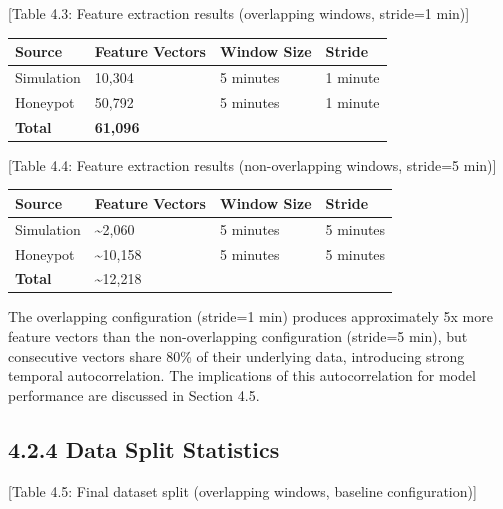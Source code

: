 \documentclass[
  a4paper]{report}
\newcounter{none} %
\begin{document}
{[}Table 4.3: Feature extraction results (overlapping windows, stride=1
min){]}

{\def\LTcaptype{none} %
\begin{longtable}[]{@{}llll@{}}
\toprule\noalign{}
Source & Feature Vectors & Window Size & Stride \\
\midrule\noalign{}
\endhead
\bottomrule\noalign{}
\endlastfoot
Simulation & 10,304 & 5 minutes & 1 minute \\
Honeypot & 50,792 & 5 minutes & 1 minute \\
\textbf{Total} & \textbf{61,096} & & \\
\end{longtable}
}

{[}Table 4.4: Feature extraction results (non-overlapping windows,
stride=5 min){]}

{\def\LTcaptype{none} %
\begin{longtable}[]{@{}llll@{}}
\toprule\noalign{}
Source & Feature Vectors & Window Size & Stride \\
\midrule\noalign{}
\endhead
\bottomrule\noalign{}
\endlastfoot
Simulation & \textasciitilde2,060 & 5 minutes & 5 minutes \\
Honeypot & \textasciitilde10,158 & 5 minutes & 5 minutes \\
\textbf{Total} & \textasciitilde12,218 & & \\
\end{longtable}
}

The overlapping configuration (stride=1 min) produces approximately 5x
more feature vectors than the non-overlapping configuration (stride=5
min), but consecutive vectors share 80\% of their underlying data,
introducing strong temporal autocorrelation. The implications of this
autocorrelation for model performance are discussed in Section 4.5.

\subsection{4.2.4 Data Split Statistics}\label{data-split-statistics}

{[}Table 4.5: Final dataset split (overlapping windows, baseline
configuration){]}
\end{document}
